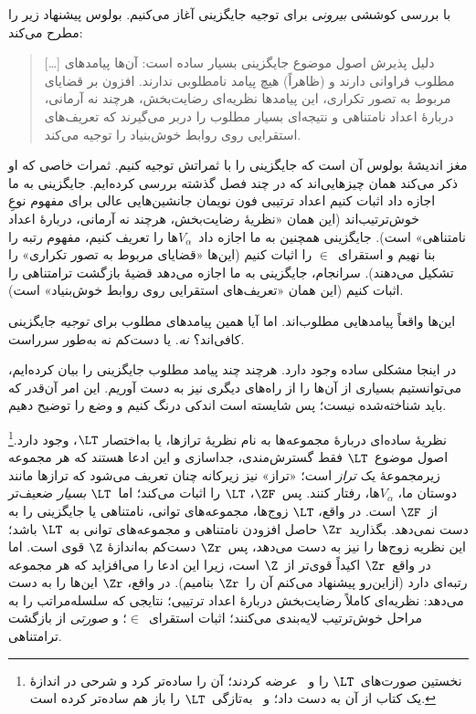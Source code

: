 \documentclass[../../../include/open-logic-section]{subfiles}
\begin{document}

با بررسی کوششی \emph{بیرونی} برای توجیه جایگزینی آغاز می‌کنیم. بولوس
پیشنهاد زیر را مطرح می‌کند:
\begin{quote}
  [\ldots] دلیل پذیرش اصول موضوع جایگزینی بسیار ساده است: آن‌ها پیامدهای
  مطلوب فراوانی دارند و (ظاهراً) هیچ پیامد نامطلوبی ندارند. افزون بر
  قضایای مربوط به تصور تکراری، این پیامدها نظریه‌ای رضایت‌بخش، هرچند نه
  آرمانی، دربارهٔ اعداد نامتناهی و نتیجه‌ای بسیار مطلوب را دربر می‌گیرند
  که تعریف‌های استقرایی روی روابط خوش‌بنیاد را توجیه می‌کند.
  \citep[229]{Boolos1971}
\end{quote}
مغز اندیشهٔ بولوس آن است که جایگزینی را با ثمراتش توجیه کنیم. ثمرات
خاصی که او ذکر می‌کند همان چیزهایی‌اند که در چند فصل گذشته بررسی
کرده‌ایم. جایگزینی به ما اجازه داد اثبات کنیم اعداد ترتیبی فون نویمان
جانشین‌هایی عالی برای مفهوم نوعِ خوش‌ترتیب‌اند (این همان «نظریهٔ
رضایت‌بخش، هرچند نه آرمانی، دربارهٔ اعداد نامتناهی» است). جایگزینی همچنین
به ما اجازه داد~$V_\alpha$ها را تعریف کنیم، مفهوم رتبه را بنا نهیم و
استقرای~$\in$ را اثبات کنیم (این‌ها «قضایای مربوط به تصور تکراری» را
تشکیل می‌دهند). سرانجام، جایگزینی به ما اجازه می‌دهد قضیهٔ بازگشت
ترامتناهی را اثبات کنیم (این همان «تعریف‌های استقرایی روی روابط
خوش‌بنیاد» است).

این‌ها واقعاً پیامدهایی مطلوب‌اند. اما آیا همین پیامدهای مطلوب برای
\emph{توجیه} جایگزینی کافی‌اند؟ \emph{نه}. یا دست‌کم نه به‌طور
سرراست.

در اینجا مشکلی ساده وجود دارد. هرچند چند پیامد مطلوب جایگزینی را بیان
کرده‌ایم، می‌توانستیم بسیاری از آن‌ها را از راه‌های دیگری نیز به دست
آوریم. این امر آن‌قدر که باید شناخته‌شده نیست؛ پس شایسته است اندکی درنگ
کنیم و وضع را توضیح دهیم.

نظریهٔ ساده‌ای دربارهٔ مجموعه‌ها به نام نظریهٔ ترازها، یا به‌اختصار
$\LT$، وجود دارد.\footnote{نخستین صورت‌های~$\LT$ را
\citet{Montague1965} و~\citet{Scott1974} عرضه کردند؛
\citet{Potter2004} آن را ساده‌تر کرد و شرحی در اندازهٔ یک کتاب از آن
به دست داد؛ و~\citet{ButtonLT1} به‌تازگی~$\LT$ را باز هم ساده‌تر کرده
است.} اصول موضوع~$\LT$ فقط گسترش‌مندی، جداسازی و این ادعا هستند که هر
مجموعه زیرمجموعهٔ یک \emph{تراز} است؛ «تراز» نیز زیرکانه چنان تعریف
می‌شود که ترازها مانند دوستان ما، $V_\alpha$ها، رفتار کنند. پس~$\ZF$،
$\LT$ را اثبات می‌کند؛ اما~$\LT$ \emph{بسیار} ضعیف‌تر از~$\ZF$ است.
در واقع، $\LT$ زوج‌ها، مجموعه‌های توانی، نامتناهی یا جایگزینی را به دست
نمی‌دهد. بگذارید~$\Zr$ حاصل افزودن نامتناهی و مجموعه‌های توانی به~$\LT$
باشد؛ این نظریه زوج‌ها را نیز به دست می‌دهد، پس~$\Zr$ دست‌کم به‌اندازهٔ
$\Z$ قوی است. اما در واقع~$\Zr$ اکیداً قوی‌تر از~$\Z$ است، زیرا این
ادعا را می‌افزاید که هر مجموعه رتبه‌ای دارد (ازاین‌رو پیشنهاد می‌کنم آن
را~$\Zr$ بنامیم). در واقع، $\Zr$ این‌ها را به دست می‌دهد: نظریه‌ای
کاملاً رضایت‌بخش دربارهٔ اعداد ترتیبی؛ نتایجی که سلسله‌مراتب را به مراحل
خوش‌ترتیب لایه‌بندی می‌کنند؛ اثبات استقرای~$\in$؛ و \emph{صورتی} از
بازگشت ترامتناهی.
\end{document}
